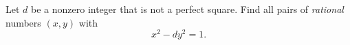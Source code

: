 Let $d$ be a nonzero integer that is not a perfect square. Find all pairs of \emph{rational} numbers $(x,y)$ with
\[x^2-dy^2=1 .\]
